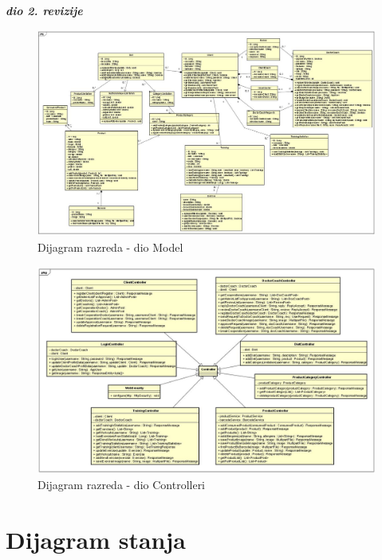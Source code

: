 			\textbf{\textit{dio 2. revizije}}\\			
			
			\begin{figure}[H]
			\includegraphics[scale=0.65]{dijagrami/Model}
			\centering
			\caption{Dijagram razreda - dio Model}
			\label{fig:promjene}
			\end{figure}
			\begin{figure}[H]
			\includegraphics[scale=0.65]{dijagrami/Controller}
			\centering
			\caption{Dijagram razreda - dio Controlleri}
			\label{fig:promjene}
			\end{figure}
			
			
			
			\eject
		
		\section{Dijagram stanja}
		
		
		
